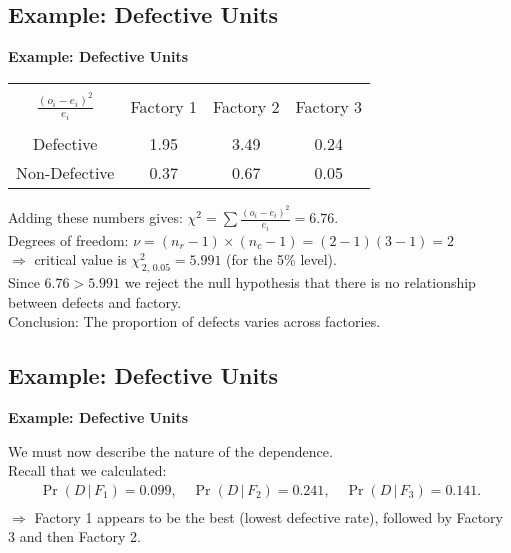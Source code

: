 \documentclass[compress]{beamer}        %
\makeatletter
\newcommand{\tcb}{\textcolor{beamer@blendedblue}}
\makeatother
\begin{document}
\subsection{Example: Defective Units}
\begin{frame}{\bf \tcb{Example: Defective Units}}\label{indep}

\begin{center}
\begin{tabular}{|c|ccc|}
\hline
&&&\\[-0.3cm]
${\displaystyle\frac{(o_i-e_i)^2}{e_i}}$      & Factory 1 & Factory 2 & Factory 3 \\[0.4cm]
\hline
&&&\\[-0.3cm]
Defective      &  1.95 & 3.49 & 0.24 \\[0.2cm]
Non-Defective  &  0.37 & 0.67 & 0.05 \\[0.1cm]
\hline
\end{tabular}
\end{center}

Adding these numbers gives: $\chi^2 = \sum \frac{(o_i-e_i)^2}{e_i} = 6.76$.\\[0.6cm]

Degrees of freedom: $\nu = (n_r-1)\times(n_c-1) = (2-1)(3-1) = 2$ \\ $\Rightarrow$ critical value is $\chi^2_{\,2,\,0.05} = 5.991$ (for the 5\% level).\\[0.6cm]


Since $6.76 > 5.991$ we reject the null hypothesis that there is no relationship between defects and factory.\\[0.2cm]

Conclusion: The proportion of defects varies across factories.

\end{frame}



\subsection{Example: Defective Units}
\begin{frame}{\bf \tcb{Example: Defective Units}}

We must now describe the nature of the dependence.\\[1cm]

Recall that we calculated:\\[-0.3cm]
\begin{align*}
\Pr(D\,|\,F_1) = 0.099,\quad \Pr(D\,|\,F_2) = 0.241,\quad \Pr(D\,|\,F_3) = 0.141.\\
\end{align*}
$\Rightarrow$ Factory 1 appears to be the best (lowest defective rate), followed by Factory 3 and then Factory 2.

\end{frame}
\end{document}
